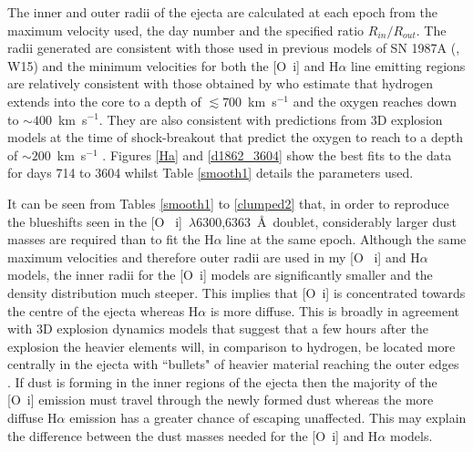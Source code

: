 The inner and outer radii of the ejecta are calculated at each epoch from 
the maximum velocity used, the day number and the specified ratio 
$R_{in}/R_{out}$.  The radii generated are consistent with those used in 
previous models of SN 1987A (\citet{Ercolano2007}, W15) and the 
minimum velocities for both the [O~{\sc i}] and H$\alpha$ line emitting 
regions are relatively consistent with those obtained by \citet{Kozma1998b} 
who estimate that  hydrogen extends into the core to a depth of 
$\lesssim 700$~km~s$^{-1}$ and the oxygen reaches down to $\sim 
400$~km~s$^{-1}$.  They are also consistent with predictions from 3D 
explosion models at the time of shock-breakout that predict the oxygen to 
reach to a depth of $\sim 200$~km~s$^{-1}$ 
\citep{Hammer2010,Wongwathanarat2015}. Figures \ref{Ha} and 
\ref{d1862_3604} show the best fits to the data for days 714 to 3604 
whilst Table \ref{smooth1} details the parameters used.

It can be seen from Tables \ref{smooth1} to \ref{clumped2} that, in order 
to reproduce the blueshifts seen in the [O~{\sc 
i}]~$\lambda$6300,6363~\AA\ doublet, considerably larger dust masses are 
required than to fit the H$\alpha$ line at the same epoch.  Although the 
same maximum velocities and therefore outer radii are used in my [O~{\sc 
i}] and H$\alpha$ models, the inner radii for the [O~{\sc i}] models are 
significantly smaller and the density distribution much steeper.  This 
implies that [O~{\sc i}] is concentrated towards the centre of the 
ejecta whereas H$\alpha$ is more diffuse.  This is broadly in 
agreement with 3D explosion dynamics models that suggest that a few hours 
after the explosion the heavier elements will, in comparison to hydrogen, 
be located more centrally in the ejecta with ``bullets" of heavier 
material reaching the outer edges \citep{Hammer2010}.  If dust is forming 
in the inner regions of the ejecta then the majority of the [O~{\sc i}] 
emission must travel through the newly formed dust whereas the more 
diffuse H$\alpha$ emission has a greater chance of escaping unaffected.  
This may explain the difference between the dust masses needed for the 
[O~{\sc i}] and H$\alpha$ models.


